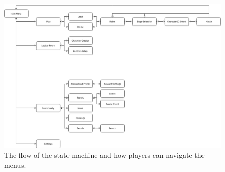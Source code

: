 \begin{figure}[h!]
    \centering
    \includegraphics[width=1\linewidth]{images/flow-menu.png}
    \caption{The flow of the state machine and how players can navigate the menus.}
\end{figure}
